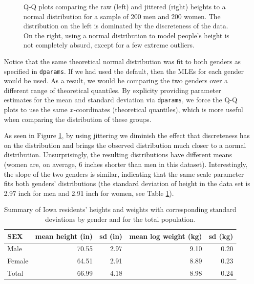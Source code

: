 \begin{Schunk}
\begin{figure}
{}

\caption[Q-Q plots comparing the raw (left) and jittered (right) heights to a normal distribution for a sample of 200 men and 200 women]{Q-Q plots comparing the raw (left) and jittered (right) heights to a normal distribution for a sample of 200 men and 200 women. The distribution on the left is dominated by the discreteness of the data. On the right, using a normal distribution to model people's height is not completely absurd, except for a few extreme outliers.}\label{fig:heights}
\end{figure}
\end{Schunk}

Notice that the same theoretical normal distribution was fit to both
genders as specified in \texttt{dparams}. If we had used the default,
then the MLEs for each gender would be used. As a result, we would be
comparing the two genders over a different range of theoretical
quantiles. By explicity providing parameter estimates for the mean and
standard deviation via \texttt{dparams}, we force the Q-Q plots to use
the same \(x\)-coordinates (theoretical quantiles), which is more useful
when comparing the distribution of these groups.

As seen in Figure \ref{fig:heights}, by using jittering we diminish the
effect that discreteness has on the distribution and brings the observed
distribution much closer to a normal distribution. Unsurprisingly, the
resulting distributions have different means (women are, on average, 6
inches shorter than men in this dataset). Interestingly, the slope of
the two genders is similar, indicating that the same scale parameter
fits both genders' distributions (the standard deviation of height in
the data set is 2.97 inch for men and 2.91 inch for women, see Table
\ref{tab:heights}).

\begin{table}

\caption{\label{tab:heights-table}Summary of Iowa residents' heights and weights with corresponding standard deviations by gender and for the total population.\label{tab:heights}}
\centering
\begin{tabular}[t]{lrrrr}
\toprule
SEX & mean height (in) & sd (in) & mean log weight (kg) & sd (kg)\\
\midrule
Male & 70.55 & 2.97 & 9.10 & 0.20\\
Female & 64.51 & 2.91 & 8.89 & 0.23\\
Total & 66.99 & 4.18 & 8.98 & 0.24\\
\bottomrule
\end{tabular}
\end{table}

